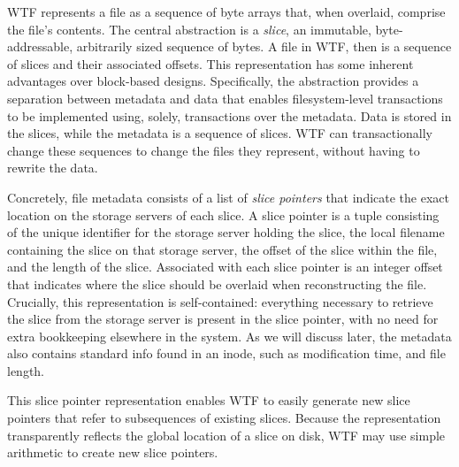 \documentclass[twocolumn,10pt,letterpaper]{article}
\begin{document}
WTF represents a file as a sequence of byte arrays that, when overlaid, comprise
the file's contents.  The central abstraction is a {\em slice}, an immutable,
byte-addressable, arbitrarily sized sequence of bytes.  A file in WTF, then is a
sequence of slices and their associated offsets.  This representation has some
inherent advantages over block-based designs.  Specifically, the abstraction
provides a separation between metadata and data that enables filesystem-level
transactions to be implemented using, solely, transactions over the metadata.
Data is stored in the slices, while the metadata is a sequence of slices.  WTF
can transactionally change these sequences to change the files they represent,
without having to rewrite the data.

Concretely, file metadata consists of a list of {\em slice pointers} that
indicate the exact location on the storage servers of each slice.  A slice
pointer is a tuple consisting of the unique identifier for the storage server
holding the slice, the local filename containing the slice on that storage
server, the offset of the slice within the file, and the length of the slice.
Associated with each slice pointer is an integer offset that indicates where the
slice should be overlaid when reconstructing the file.  Crucially, this
representation is self-contained: everything necessary to retrieve the slice
from the storage server is present in the slice pointer, with no need for extra
bookkeeping elsewhere in the system.  As we will discuss later, the metadata
also contains standard info found in an inode, such as modification time, and
file length.

This slice pointer representation enables WTF to easily generate new slice
pointers that refer to subsequences of existing slices.  Because the
representation transparently reflects the global location of a slice on disk,
WTF may use simple arithmetic to create new slice pointers.
\end{document}
